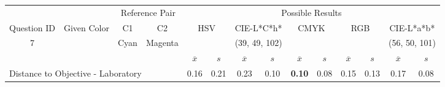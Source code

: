 \begin{table}[H]
  \resizebox{\textwidth}{!} {
  \begin{tabular}{lccccccccccccc}
    \hline
    \multicolumn{1}{c}{}                              &                                      & \multicolumn{2}{c}{Reference Pair}                   & \multicolumn{10}{c}{Possible Results}                                                                                                                                                                                                                                                                                        \\ \cline{3-14}
    \multicolumn{1}{c}{\multirow{-2}{*}{Question ID}} & \multirow{-2}{*}{Given Color}        & C1                       & C2                         & \multicolumn{2}{c}{HSV}                                        & \multicolumn{2}{c}{CIE-L*C*h*}                                 & \multicolumn{2}{c}{CMYK}                                       & \multicolumn{2}{c}{RGB}                                        & \multicolumn{2}{c}{CIE-L*a*b*}                                 \\ \hline
    \multicolumn{1}{c}{7}                             & \cellcolor[HTML]{0000FF}{\color[HTML]{FFFFFF}(18, 7, 95)} & \multicolumn{1}{c|}{Cyan} & \multicolumn{1}{c|}{Magenta}  & \multicolumn{2}{c|}{\cellcolor[HTML]{0000FF}{\color[HTML]{FFFFFF}(18, 7, 95)}}      & \multicolumn{2}{c|}{\cellcolor[HTML]{00CAFF}(39, 49, 102)}       & \multicolumn{2}{c|}{\cellcolor[HTML]{8080FF}{\color[HTML]{FFFFFF}(35, 27, 98)}}       & \multicolumn{2}{c|}{\cellcolor[HTML]{8080FF}{\color[HTML]{FFFFFF}(35, 27, 98)}}       & \multicolumn{2}{c|}{\cellcolor[HTML]{C6AEFF}(56, 50, 101)}       \\ \hline
                                                      & \multicolumn{1}{l}{}                 & \multicolumn{1}{l}{}     & \multicolumn{1}{l}{}       & \multicolumn{1}{c}{$\overline{x}$} & \multicolumn{1}{c}{$s$} & \multicolumn{1}{c}{$\overline{x}$} & \multicolumn{1}{c}{$s$} & \multicolumn{1}{c}{$\overline{x}$} & \multicolumn{1}{c}{$s$} & \multicolumn{1}{c}{$\overline{x}$} & \multicolumn{1}{c}{$s$} & \multicolumn{1}{c}{$\overline{x}$} & \multicolumn{1}{c}{$s$} \\ \hline
    \multicolumn{4}{l}{Distance to Objective - Laboratory}                                                                                           & \multicolumn{1}{|c}{0.16}       & \multicolumn{1}{c|}{0.21}    & \multicolumn{1}{|c}{0.23}       & \multicolumn{1}{c|}{0.10}    & \multicolumn{1}{|c}{\textbf{0.10}}       & \multicolumn{1}{c|}{0.08}    & \multicolumn{1}{|c}{0.15}       & \multicolumn{1}{c|}{0.13}    & \multicolumn{1}{|c}{0.17}       & \multicolumn{1}{c|}{0.08}    \\

\end{tabular}}
\end{table}
